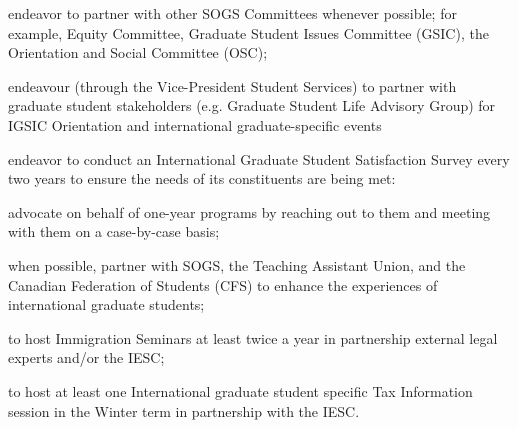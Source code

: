 \begin{longenum}[ label*=\thesubsection.\arabic*., align=left]
\begin{longenum}[ label*=\arabic*., align=left]
	\item endeavor to partner with other SOGS Committees whenever possible; for example, Equity Committee, Graduate Student Issues Committee (GSIC), the Orientation and Social Committee (OSC);
	\item endeavour (through the Vice-President Student Services) to partner with graduate student stakeholders (e.g. Graduate Student Life Advisory Group) for IGSIC Orientation and international graduate-specific events
	\item endeavor to conduct an International Graduate Student Satisfaction Survey every two years to ensure the needs of its constituents are being met:
		\begin{longenum}[ label*=\arabic*., align=left]
		\item advocate on behalf of one-year programs by reaching out to them and meeting with them on a case-by-case basis;
		\item when possible, partner with SOGS, the Teaching Assistant Union, and the Canadian Federation of Students (CFS) to enhance the experiences of international graduate students;
		\item to host Immigration Seminars at least twice a year in partnership external legal experts and/or the IESC;
		\item to host at least one International graduate student specific Tax Information session in the Winter term in partnership with the IESC.
		\end{longenum}
	\end{longenum}
\end{longenum}